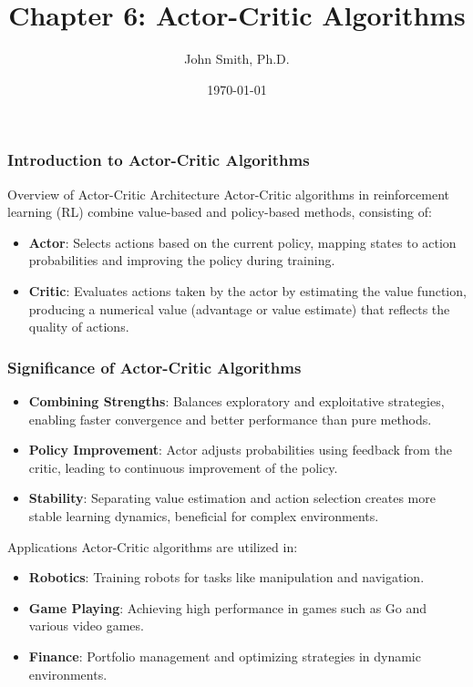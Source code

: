 \documentclass[aspectratio=169]{beamer}
\title[Actor-Critic Algorithms]{Chapter 6: Actor-Critic Algorithms}
\author[J. Smith]{John Smith, Ph.D.}
\institute[University Name]{
  Department of Computer Science\\
  University Name\\
  \vspace{0.3cm}
  Email: email@university.edu\\
  Website: www.university.edu
}
\date{\today}
\begin{document}
\frame{\titlepage}

\begin{frame}[fragile]
    \frametitle{Introduction to Actor-Critic Algorithms}
    \begin{block}{Overview of Actor-Critic Architecture}
        Actor-Critic algorithms in reinforcement learning (RL) combine value-based and policy-based methods, consisting of:
        \begin{itemize}
            \item \textbf{Actor}: Selects actions based on the current policy, mapping states to action probabilities and improving the policy during training.
            \item \textbf{Critic}: Evaluates actions taken by the actor by estimating the value function, producing a numerical value (advantage or value estimate) that reflects the quality of actions.
        \end{itemize}
    \end{block}
\end{frame}

\begin{frame}[fragile]
    \frametitle{Significance of Actor-Critic Algorithms}
    \begin{itemize}
        \item \textbf{Combining Strengths}: Balances exploratory and exploitative strategies, enabling faster convergence and better performance than pure methods.
        \item \textbf{Policy Improvement}: Actor adjusts probabilities using feedback from the critic, leading to continuous improvement of the policy.
        \item \textbf{Stability}: Separating value estimation and action selection creates more stable learning dynamics, beneficial for complex environments.
    \end{itemize}
    
    \begin{block}{Applications}
        Actor-Critic algorithms are utilized in:
        \begin{itemize}
            \item \textbf{Robotics}: Training robots for tasks like manipulation and navigation.
            \item \textbf{Game Playing}: Achieving high performance in games such as Go and various video games.
            \item \textbf{Finance}: Portfolio management and optimizing strategies in dynamic environments.
        \end{itemize}
    \end{block}
\end{frame}
\end{document}
